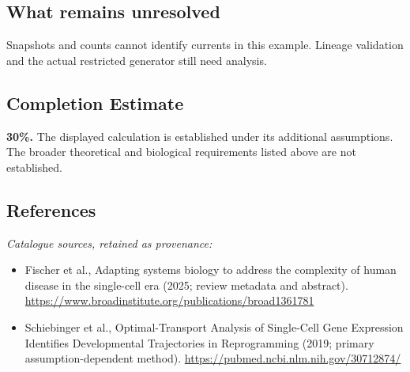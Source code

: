 \documentclass[11pt]{article}
\begin{document}
\subsection{What remains unresolved}
Snapshots and counts cannot identify currents in this example. Lineage validation and the actual restricted generator still need analysis.
\subsection{Completion Estimate}
\textbf{30\%.} The displayed calculation is established under its additional assumptions. The broader theoretical and biological requirements listed above are not established.
\subsection{References}
\noindent\emph{Catalogue sources, retained as provenance:}
\begin{itemize}
\item Fischer et al., Adapting systems biology to address the complexity of human disease in the single-cell era (2025; review metadata and abstract). \url{https://www.broadinstitute.org/publications/broad1361781}
\item Schiebinger et al., Optimal-Transport Analysis of Single-Cell Gene Expression Identifies Developmental Trajectories in Reprogramming (2019; primary assumption-dependent method). \url{https://pubmed.ncbi.nlm.nih.gov/30712874/}
\end{itemize}
\end{document}
